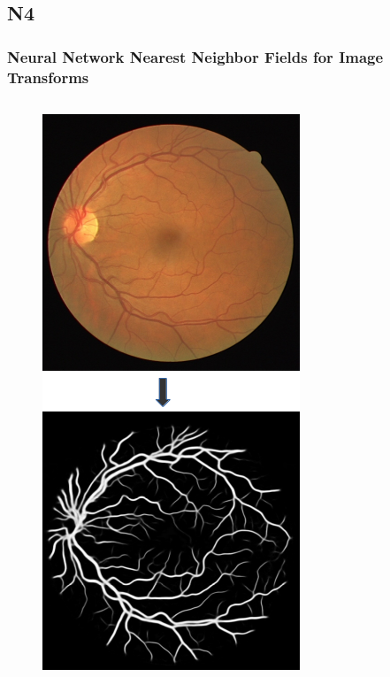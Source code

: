\documentclass{beamer}
\begin{document}
\begin{frame}
\begin{columns}[c]
\end{columns}

\end{frame}





\subsection{N4}

\begin{frame}
\frametitle{Neural Network Nearest Neighbor Fields for Image Transforms}
\begin{columns}[c] %

\begin{figure}
\includegraphics[width=0.6\linewidth]{Images/N4.png}
\end{figure}


\end{columns}
\end{frame}
\end{document}
